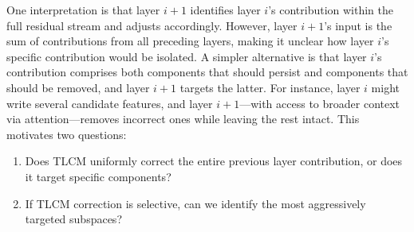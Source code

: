 One interpretation is that layer $i+1$ identifies layer $i$'s contribution within the full residual stream and adjusts accordingly. However, layer $i+1$'s input is the sum of contributions from all preceding layers, making it unclear how layer $i$'s specific contribution would be isolated. A simpler alternative is that layer $i$'s contribution comprises both components that should persist and components that should be removed, and layer $i+1$ targets the latter. For instance, layer $i$ might write several candidate features, and layer $i+1$---with access to broader context via attention---removes incorrect ones while leaving the rest intact. This motivates two questions:
\begin{enumerate}
    \item Does TLCM uniformly correct the entire previous layer contribution, or does it target specific components?
    \item If TLCM correction is selective, can we identify the most aggressively targeted subspaces?
\end{enumerate}






